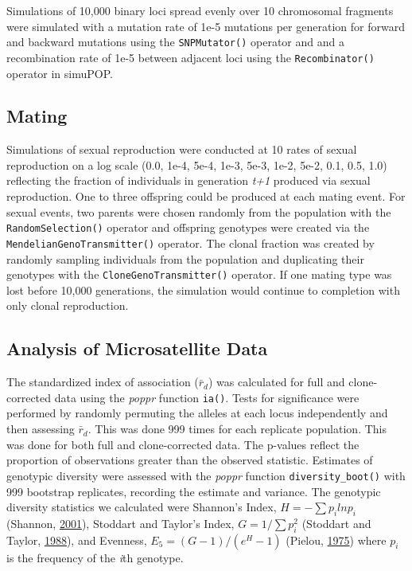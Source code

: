 \documentclass[double,12pt]{beavtex}
\begin{document}
  Simulations of 10,000 binary loci spread evenly over 10 chromosomal
  fragments were simulated with a mutation rate of 1e-5 mutations per
  generation for forward and backward mutations using the
  \texttt{SNPMutator()} operator and and a recombination rate of 1e-5
  between adjacent loci using the \texttt{Recombinator()} operator in
  simuPOP.
  
  \subsection{Mating}\label{mating}
  
  Simulations of sexual reproduction were conducted at 10 rates of sexual
  reproduction on a log scale (0.0, 1e-4, 5e-4, 1e-3, 5e-3, 1e-2, 5e-2,
  0.1, 0.5, 1.0) reflecting the fraction of individuals in generation
  \emph{t+1} produced via sexual reproduction. One to three offspring
  could be produced at each mating event. For sexual events, two parents
  were chosen randomly from the population with the
  \texttt{RandomSelection()} operator and offspring genotypes were created
  via the \texttt{MendelianGenoTransmitter()} operator. The clonal
  fraction was created by randomly sampling individuals from the
  population and duplicating their genotypes with the
  \texttt{CloneGenoTransmitter()} operator. If one mating type was lost
  before 10,000 generations, the simulation would continue to completion
  with only clonal reproduction.
  
  \subsection{Analysis of Microsatellite
  Data}\label{analysis-of-microsatellite-data}
  
  The standardized index of association (\(\bar{r}_d\)) was calculated for
  full and clone-corrected data using the \emph{poppr} function
  \texttt{ia()}. Tests for significance were performed by randomly
  permuting the alleles at each locus independently and then assessing
  \(\bar{r}_d\). This was done 999 times for each replicate population.
  This was done for both full and clone-corrected data. The p-values
  reflect the proportion of observations greater than the observed
  statistic. Estimates of genotypic diversity were assessed with the
  \emph{poppr} function \texttt{diversity\_boot()} with 999 bootstrap
  replicates, recording the estimate and variance. The genotypic diversity
  statistics we calculated were Shannon's Index, \(H = -\sum p_i ln p_i\)
  (Shannon, \protect\hyperlink{ref-shannon2001mathematical}{2001}),
  Stoddart and Taylor's Index, \(G = 1/\sum p_i^2\) (Stoddart and Taylor,
  \protect\hyperlink{ref-stoddart1988genotypic}{1988}), and Evenness,
  \(E_5 = (G - 1)/(e^H - 1)\) (Pielou,
  \protect\hyperlink{ref-pielou1975ecological}{1975}) where \(p_i\) is the
  frequency of the \emph{i}th genotype.
  
\end{document}
